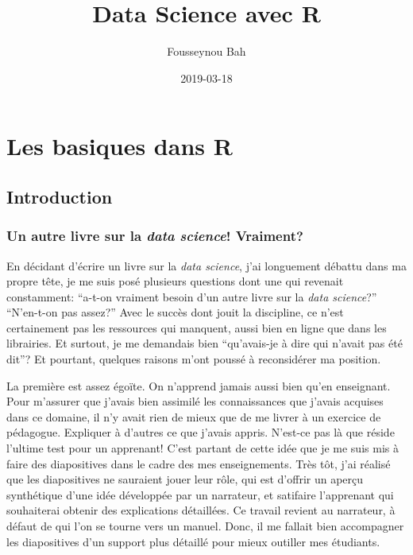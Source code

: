 \documentclass[]{book}
\title{Data Science avec R}
\author{Fousseynou Bah}
\date{2019-03-18}
\begin{document}
\maketitle

{
\hypersetup{linkcolor=black}
\setcounter{tocdepth}{1}
\tableofcontents
}
\part{Les basiques dans R}\label{part-les-basiques-dans-r}

\chapter{Introduction}\label{introduction}

\section{\texorpdfstring{Un autre livre sur la \emph{data science}!
Vraiment?}{Un autre livre sur la data science! Vraiment?}}\label{un-autre-livre-sur-la-data-science-vraiment}

En décidant d'écrire un livre sur la \emph{data science}, j'ai
longuement débattu dans ma propre tête, je me suis posé plusieurs
questions dont une qui revenait constamment: ``a-t-on vraiment besoin
d'un autre livre sur la \emph{data science}?'' ``N'en-t-on pas assez?''
Avec le succès dont jouit la discipline, ce n'est certainement pas les
ressources qui manquent, aussi bien en ligne que dans les librairies. Et
surtout, je me demandais bien ``qu'avais-je à dire qui n'avait pas été
dit''? Et pourtant, quelques raisons m'ont poussé à reconsidérer ma
position.

La première est assez égoïte. On n'apprend jamais aussi bien qu'en
enseignant. Pour m'assurer que j'avais bien assimilé les connaissances
que j'avais acquises dans ce domaine, il n'y avait rien de mieux que de
me livrer à un exercice de pédagogue. Expliquer à d'autres ce que
j'avais appris. N'est-ce pas là que réside l'ultime test pour un
apprenant! C'est partant de cette idée que je me suis mis à faire des
diapositives dans le cadre des mes enseignements. Très tôt, j'ai réalisé
que les diapositives ne sauraient jouer leur rôle, qui est d'offrir un
aperçu synthétique d'une idée développée par un narrateur, et satifaire
l'apprenant qui souhaiterai obtenir des explications détaillées. Ce
travail revient au narrateur, à défaut de qui l'on se tourne vers un
manuel. Donc, il me fallait bien accompagner les diapositives d'un
support plus détaillé pour mieux outiller mes étudiants.
\end{document}
